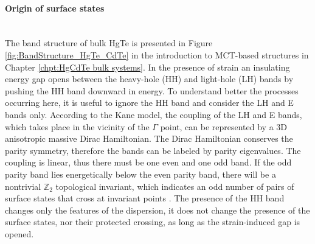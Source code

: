 \documentclass[titlepage,a4paper]{book}
\newcommand{\wciecie}{\quad\phantom{v}}
\newcommand{\myparagraph}[1]{\paragraph{#1}\mbox{}\\}
\begin{document}
\myparagraph{Origin of surface states}
\wciecie
The band structure of bulk HgTe is presented in Figure \ref{fig:BandStructure_HgTe_CdTe} in the introduction to MCT-based structures in Chapter \ref{chpt:HgCdTe bulk systems}. In the presence of strain an insulating energy gap opens between the heavy-hole (HH) and light-hole (LH) bands by pushing the HH band downward in energy. To understand better the processes occurring here, it is useful to ignore the HH band and consider the LH and E bands only. According to the Kane model, the coupling of the LH and E bands, which takes place in the vicinity of the $\Gamma$ point, can be represented by a 3D anisotropic massive Dirac Hamiltonian. The Dirac Hamiltonian conserves the parity symmetry, therefore the bands can be labeled by parity eigenvalues. The coupling is linear, thus there must be one even and one odd band. If the odd parity band lies energetically below the even parity band, there will be a nontrivial $\mathbb{Z}_2$ topological invariant, which indicates an odd number of pairs of surface states that cross at invariant points \cite{Dai_MCT_layers}\cite{Kane_Fu}. The presence of the HH band changes only the features of the dispersion, it does not change the presence of the surface states, nor their protected crossing, as long as the strain-induced gap is opened.

\end{document}
